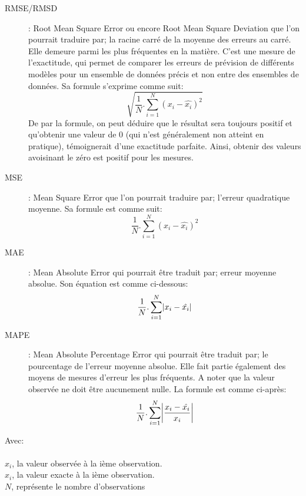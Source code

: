 \documentclass[a4paper, 12pt]{book}
\begin{document}
\begin{description}
	\item[RMSE/RMSD]: Root Mean Square Error ou encore Root Mean Square Deviation que l'on pourrait traduire par; la racine carré de la moyenne des erreurs au carré. Elle demeure parmi les plus fréquentes en la matière. C'est une mesure de l'exactitude, qui permet de comparer les erreurs de prévision de différents modèles pour un ensemble de données précis et non entre des ensembles de données. Sa formule s'exprime comme suit:
	\begin{equation}
		\sqrt{\frac{1}{N}.\sum_{i = 1}^{N}(x_i - \hat{x_i})^2}
	\end{equation}	
De par la formule, on peut déduire que le résultat sera toujours positif et qu'obtenir une valeur de 0 (qui n'est généralement non atteint en pratique), témoignerait d'une exactitude parfaite. Ainsi, obtenir des valeurs avoisinant le zéro est positif pour les mesures.
	\item[MSE]: Mean Square Error que l'on pourrait traduire par; l'erreur quadratique moyenne. Sa formule est comme suit:
	\begin{equation}
		\frac{1}{N}.\sum_{i = 1}^{N}(x_i - \hat{x_i})^2
	\end{equation}
	
	\item[MAE]: Mean Absolute Error qui pourrait être traduit par; erreur moyenne absolue. Son équation est comme ci-dessous:
	\begin{equation}
		\frac{1}{N}.\sum_{i = 1}^{N} \abs{x_i - \hat{x_i}}
	\end{equation}	 
	\item[MAPE]: Mean Absolute Percentage Error qui pourrait être traduit par; le pourcentage de l'erreur moyenne absolue. Elle fait partie également des moyens de mesures d'erreur les plus fréquents. A noter que la valeur observée ne doit être aucunement nulle. La formule est comme ci-après:
	\begin{equation}		
		\frac{1}{N}.\sum_{i = 1}^{N} \abs{\frac{x_i - \hat{x_i}}{x_i}}
	\end{equation}
\end{description}


Avec: \\ \\
$x_i$, la valeur observée à la ième observation. \\
$\hat{x}_i$, la valeur exacte à la ième observation. \\
$N$, représente le nombre d'observations
\end{document}
